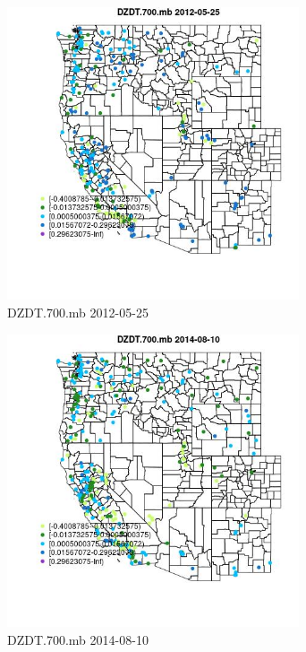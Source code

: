 \begin{figure} 
\centering  
\includegraphics[width=0.77\textwidth]{Code_Outputs/Report_ML_input_PM25_Step4_part_e_de_duplicated_aves_compiled_2019-05-18wNAs_MapObsDZDT700mb2012-05-25.jpg} 
\caption{\label{fig:Report_ML_input_PM25_Step4_part_e_de_duplicated_aves_compiled_2019-05-18wNAsMapObsDZDT700mb2012-05-25}DZDT.700.mb 2012-05-25} 
\end{figure} 
 

\begin{figure} 
\centering  
\includegraphics[width=0.77\textwidth]{Code_Outputs/Report_ML_input_PM25_Step4_part_e_de_duplicated_aves_compiled_2019-05-18wNAs_MapObsDZDT700mb2014-08-10.jpg} 
\caption{\label{fig:Report_ML_input_PM25_Step4_part_e_de_duplicated_aves_compiled_2019-05-18wNAsMapObsDZDT700mb2014-08-10}DZDT.700.mb 2014-08-10} 
\end{figure} 
 

